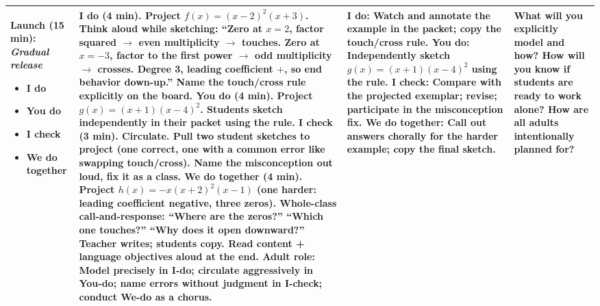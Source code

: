 \documentclass[11pt]{article}
\begin{document}
\begin{xltabular}{\textwidth}{|p{1.15in}|p{2.1in}|p{1.6in}|p{0.95in}|}
\textbf{Launch (15 min):} \newline \textbf{\textit{Gradual release}}
\begin{itemize}[label=$\bullet$, leftmargin=*, nosep]
    \item I do
    \item You do
    \item I check
    \item We do together
\end{itemize} &
\textbf{I do (4 min).} Project $f(x) = (x-2)^2(x+3)$. Think aloud while sketching: ``Zero at $x=2$, factor squared $\rightarrow$ even multiplicity $\rightarrow$ touches. Zero at $x=-3$, factor to the first power $\rightarrow$ odd multiplicity $\rightarrow$ crosses. Degree 3, leading coefficient $+$, so end behavior down-up.'' Name the touch/cross rule explicitly on the board. \newline\newline
\textbf{You do (4 min).} Project $g(x) = (x+1)(x-4)^2$. Students sketch independently in their packet using the rule. \newline\newline
\textbf{I check (3 min).} Circulate. Pull two student sketches to project (one correct, one with a common error like swapping touch/cross). Name the misconception out loud, fix it as a class. \newline\newline
\textbf{We do together (4 min).} Project $h(x) = -x(x+2)^2(x-1)$ (one harder: leading coefficient negative, three zeros). Whole-class call-and-response: ``Where are the zeros?'' ``Which one touches?'' ``Why does it open downward?'' Teacher writes; students copy. \newline\newline
Read content + language objectives aloud at the end. \newline\newline
\textbf{Adult role:} Model precisely in I-do; circulate aggressively in You-do; name errors without judgment in I-check; conduct We-do as a chorus. &
\textbf{I do:} Watch and annotate the example in the packet; copy the touch/cross rule. \newline\newline
\textbf{You do:} Independently sketch $g(x) = (x+1)(x-4)^2$ using the rule. \newline\newline
\textbf{I check:} Compare with the projected exemplar; revise; participate in the misconception fix. \newline\newline
\textbf{We do together:} Call out answers chorally for the harder example; copy the final sketch. &
What will you explicitly model and how? \newline\newline
How will you know if students are ready to work alone? \newline\newline
How are all adults intentionally planned for? \\
\hline


\end{xltabular}
\end{document}
